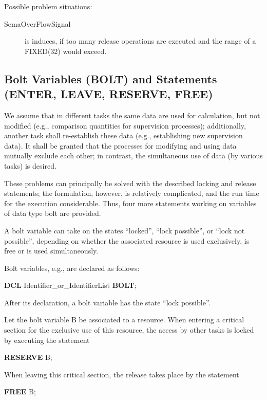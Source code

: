 \begin{added}
Possible problem situations:

\begin{description}
\item[SemaOverFlowSignal] is induces, if too many release operations
   are executed and the range of a FIXED(32) would exceed.
\end{description}

\end{added}
\begin{tobedone}
\subsection{Bolt Variables (BOLT) and Statements (ENTER, LEAVE,
RESERVE, FREE)} %

We assume that in different tasks the same data are used for
calculation, but not modified (e.g., comparison quantities for
supervision processes); additionally, another task shall re-establish
these data (e.g., establishing new supervision data). It shall be
granted that the processes for modifying and using data mutually exclude
each other; in contrast, the simultaneous use of data (by various tasks)
is desired.

These problems can principally be solved with the described locking and
release statements; the formulation, however, is relatively
complicated, and the run time for the execution considerable. Thus, four
more statements working on variables of data type bolt are provided.

A bolt variable can take on the states ``locked'', ``lock possible'', or
``lock not possible'', depending on whether the associated resource
is used exclusively, is free or is used simultaneously.

Bolt variables, e.g., are declared as follows:

{\bf DCL} Identifier\_or\_IdentifierList {\bf BOLT};

After its declaration, a bolt variable has the state ``lock possible''.

Let the bolt variable B be associated to a resource. When entering a
critical section for the exclusive use of this resource, the access by
other tasks is locked by executing the statement

{\bf RESERVE} B;

When leaving this critical section, the release takes place by the
statement

{\bf FREE} B;


\end{tobedone}
